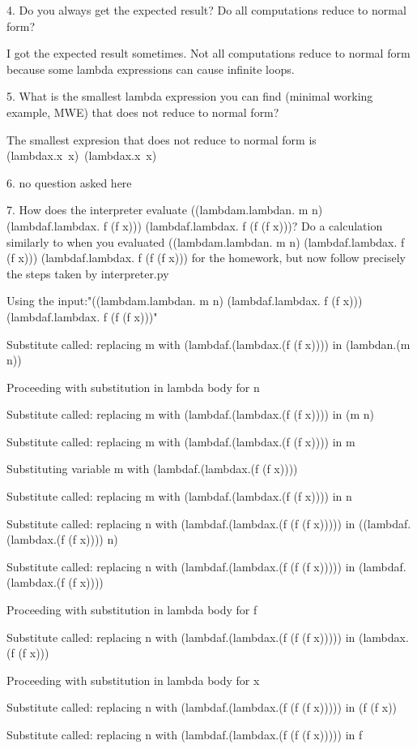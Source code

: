 \documentclass{article}
\theoremstyle{theorem}
\theoremstyle{definition}
\theoremstyle{remark}
\begin{document}
4. Do you always get the expected result? Do all computations reduce to normal form?

I got the expected result sometimes. Not all computations reduce to normal form because some lambda expressions can cause infinite loops.

5. What is the smallest lambda expression you can find (minimal working example, MWE) that does not reduce to normal form?

The smallest expresion that does not reduce to normal form is (lambdax.x x) (lambdax.x x)

6. no question asked here

7. How does the interpreter evaluate ((lambdam.lambdan. m n) (lambdaf.lambdax. f (f x))) (lambdaf.lambdax. f (f (f x)))? Do a calculation similarly to when you evaluated ((lambdam.lambdan. m n) (lambdaf.lambdax. f (f x))) (lambdaf.lambdax. f (f (f x))) for the homework, but now follow precisely the steps taken by interpreter.py

Using the input:"((lambdam.lambdan. m n) (lambdaf.lambdax. f (f x))) (lambdaf.lambdax. f (f (f x)))"

Substitute called: replacing m with (lambdaf.(lambdax.(f (f x)))) in (lambdan.(m n))

Proceeding with substitution in lambda body for n

Substitute called: replacing m with (lambdaf.(lambdax.(f (f x)))) in (m n)

Substitute called: replacing m with (lambdaf.(lambdax.(f (f x)))) in m

Substituting variable m with (lambdaf.(lambdax.(f (f x))))

Substitute called: replacing m with (lambdaf.(lambdax.(f (f x)))) in n

Substitute called: replacing n with (lambdaf.(lambdax.(f (f (f x))))) in ((lambdaf.(lambdax.(f (f x)))) n)

Substitute called: replacing n with (lambdaf.(lambdax.(f (f (f x))))) in (lambdaf.(lambdax.(f (f x))))

Proceeding with substitution in lambda body for f

Substitute called: replacing n with (lambdaf.(lambdax.(f (f (f x))))) in (lambdax.(f (f x)))

Proceeding with substitution in lambda body for x

Substitute called: replacing n with (lambdaf.(lambdax.(f (f (f x))))) in (f (f x))

Substitute called: replacing n with (lambdaf.(lambdax.(f (f (f x))))) in f
\end{document}

